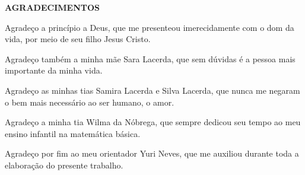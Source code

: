 	\thispagestyle{empty}
	
\onehalfspacing

\begin{center}
	\textbf{AGRADECIMENTOS}
\end{center}

\bigskip

Agradeço a princípio a Deus, que me presenteou imerecidamente com o dom da vida, por meio de seu filho Jesus Cristo. 

Agradeço também a minha mãe Sara Lacerda, que sem dúvidas é a pessoa mais importante da minha vida.

Agradeço as minhas tias Samira Lacerda e Silva Lacerda, que nunca me negaram o bem mais necessário ao ser humano, o amor.

Agradeço a minha tia Wilma da Nóbrega, que sempre dedicou seu tempo ao meu ensino infantil na matemática básica.

Agradeço por fim ao meu orientador Yuri Neves, que me auxiliou durante toda a elaboração do presente trabalho.

\newpage